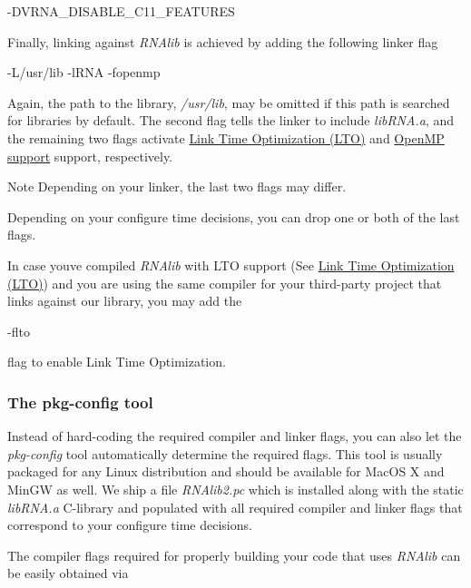 \begin{DoxyVerb}-DVRNA_DISABLE_C11_FEATURES
\end{DoxyVerb}


Finally, linking against {\itshape R\+N\+Alib} is achieved by adding the following linker flag

\begin{DoxyVerb}-L/usr/lib -lRNA -fopenmp
\end{DoxyVerb}


Again, the path to the library, {\itshape /usr/lib}, may be omitted if this path is searched for libraries by default. The second flag tells the linker to include {\itshape lib\+R\+N\+A.\+a}, and the remaining two flags activate \hyperlink{install_config_lto}{Link Time Optimization (L\+TO)} and \hyperlink{install_config_openmp}{Open\+MP support} support, respectively. \begin{DoxyNote}{Note}
Depending on your linker, the last two flags may differ. 

Depending on your configure time decisions, you can drop one or both of the last flags. 

In case you\textquotesingle{}ve compiled {\itshape R\+N\+Alib} with L\+TO support (See \hyperlink{install_config_lto}{Link Time Optimization (L\+TO)}) and you are using the same compiler for your third-\/party project that links against our library, you may add the
\begin{DoxyCode}
-flto 
\end{DoxyCode}
 flag to enable Link Time Optimization.
\end{DoxyNote}
\hypertarget{install_linking_pkgconfig}{}\subsubsection{The pkg-\/config tool}\label{install_linking_pkgconfig}
Instead of hard-\/coding the required compiler and linker flags, you can also let the {\itshape pkg-\/config} tool automatically determine the required flags. This tool is usually packaged for any Linux distribution and should be available for Mac\+OS X and Min\+GW as well. We ship a file {\itshape R\+N\+Alib2.\+pc} which is installed along with the static {\itshape lib\+R\+N\+A.\+a} C-\/library and populated with all required compiler and linker flags that correspond to your configure time decisions.

The compiler flags required for properly building your code that uses {\itshape R\+N\+Alib} can be easily obtained via

